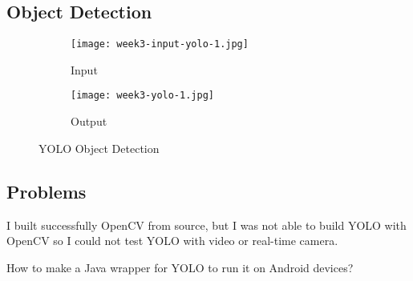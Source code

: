 \subsection{Object Detection}
\begin{figure}[!ht]
\centering
\begin{subfigure}{1\textwidth}
  \centering
  \texttt{[image: week3-input-yolo-1.jpg]}
  \caption{Input}
\end{subfigure}
\begin{subfigure}{1\textwidth}
  \centering
  \texttt{[image: week3-yolo-1.jpg]}
  \caption{Output}
\end{subfigure}
\caption{YOLO Object Detection}
\end{figure}

\subsection{Problems}
I built successfully OpenCV from source, but I was not able to build YOLO with OpenCV so I could not test YOLO with video or real-time camera.

How to make a Java wrapper for YOLO to run it on Android devices?